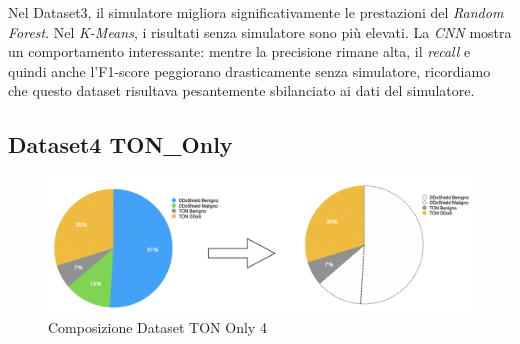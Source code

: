 \begin{table}[htbp]
\centering
\renewcommand{\arraystretch}{1.5}
\caption{Metriche di performance per Dataset3 TON\_Only}
\label{tab:performance_metrics}
\end{table}
Nel Dataset3, il simulatore migliora significativamente le prestazioni del \textit{Random Forest}. Nel \textit{K-Means}, i risultati senza simulatore sono più elevati. La \textit{CNN} mostra un comportamento interessante: mentre la precisione rimane alta, il \textit{recall} e quindi anche l'F1-score peggiorano drasticamente senza simulatore, ricordiamo che questo dataset risultava pesantemente sbilanciato ai dati del simulatore. 

\subsection{Dataset4 TON\_Only}

\begin{figure}[htbp]
\centering
\includegraphics[scale= 0.6]{UNINA_MSc_Thesis_Project/img/chapterRisulati/TON_Only/composizione_TON_ONLY4.png}
  \caption{Composizione Dataset TON Only 4}
\end{figure}

